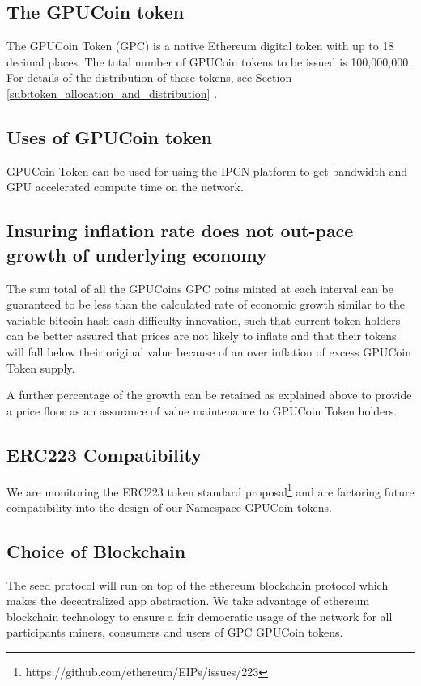 \documentclass{article}
\begin{document}
\subsection{The GPUCoin token}
The GPUCoin Token (GPC) is a native Ethereum digital token with up to 18 decimal places. The total number of GPUCoin tokens to be issued is 100,000,000. For details of the distribution of these tokens, see Section \ref{sub:token_allocation_and_distribution} .

\subsection{Uses of GPUCoin token} %
\label{sub:uses_of_hoot_token}
GPUCoin Token can be used for using the IPCN platform to get bandwidth and GPU accelerated compute time on the network.

\subsection{Insuring inflation rate does not out-pace growth of underlying economy}
The sum total of all the GPUCoins GPC coins minted at each interval can be guaranteed to be less than the calculated rate of economic growth similar to the variable bitcoin hash-cash difficulty innovation, such that current token holders can be better assured that prices are not likely to inflate and that their tokens will fall below their original value because of an over inflation of excess GPUCoin Token supply.

A further percentage of the growth can be retained as explained above to provide a price floor as an assurance of value maintenance to GPUCoin Token holders. 

\subsection{ERC223 Compatibility}
We are monitoring the ERC223 token standard proposal\footnote{https://github.com/ethereum/EIPs/issues/223} and are factoring future compatibility into the design of our Namespace GPUCoin tokens.

\subsection{Choice of Blockchain}
The seed protocol will run on top of the ethereum blockchain protocol which makes the decentralized app abstraction. We take advantage of ethereum blockchain technology to ensure a fair democratic usage of the network for all participants miners, consumers and users of GPC GPUCoin tokens.
\end{document}
